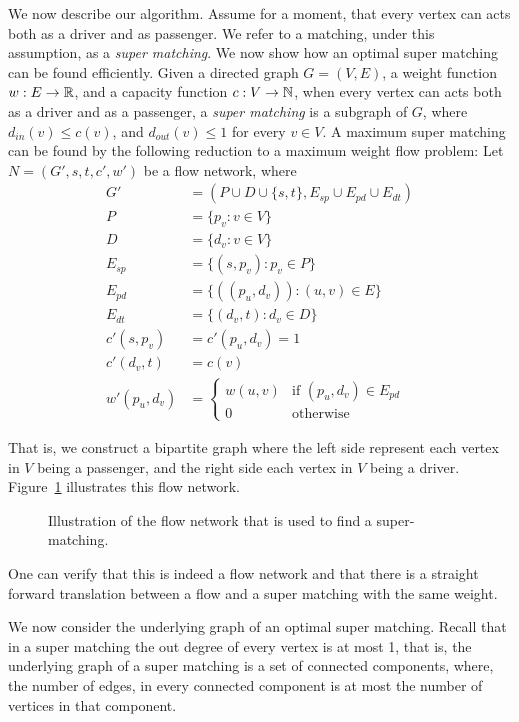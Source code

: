 We now describe our algorithm. 
Assume for a moment, 
that every vertex can acts both as a driver and as passenger.
We refer to a matching, under this assumption, as a \emph{super matching}.
We now show how an optimal super matching can be found efficiently.
Given a directed graph $G = (V, E)$,
a weight function $w : E \rightarrow \mathbb{R}$,
and a capacity function $c : V \rightarrow \mathbb{N}$, 
when every vertex can acts both as a driver and as a passenger, 
a \emph{super matching} is a subgraph of $G$, 
where $d_{in}(v) \leq c(v)$, and $d_{out}(v) \leq 1$ for every $v \in V$. 
A maximum super matching can be found by the following reduction 
to a maximum weight flow problem: 
Let $N = (G', s, t, c', w')$ be a flow network, where 
\begin{align*}
G'				& = (P \cup D \cup \{s, t\}, E_{sp} \cup E_{pd} \cup E_{dt})	\\
P				& = \{p_v : v \in V\}					\\
D				& = \{d_v : v \in V\}					\\
E_{sp}			& = \{ (s, p_v) : p_v \in P \}			\\
E_{pd}			& = \{ ((p_u, d_v)) : (u, v) \in E \}	\\
E_{dt}			& = \{ (d_v, t) : d_v \in D \}			\\
c'(s, p_v)		& = c'(p_u, d_v) = 1					\\
c'(d_v, t)		& = c(v)								\\
w'(p_u, d_v)	& = 
\begin{cases}
w(u, v) & \text{if } (p_u, d_v) \in E_{pd} \\
0 & \text{otherwise}	
\end{cases}
\end{align*}

That is, 
we construct a bipartite graph where the left side represent each vertex 
in $V$ being a passenger,
and the right side each vertex in $V$ being a driver.
Figure~\ref{fig:cm-flow} illustrates this flow network.
%
\begin{figure}

\caption{
\label{fig:cm-flow}
Illustration of the flow network that is used to find a super-matching.
}
\end{figure}
%
One can verify that this is indeed a flow network and that there is a straight forward 
translation between a flow and a super matching with the same weight.

We now consider the underlying graph of an optimal super matching.
Recall that in a super matching the out degree of every vertex is at most 1,
that is, the underlying graph of a super matching is a set of connected components,
where, the number of edges, 
in every connected component is at most the number of vertices in that component.


